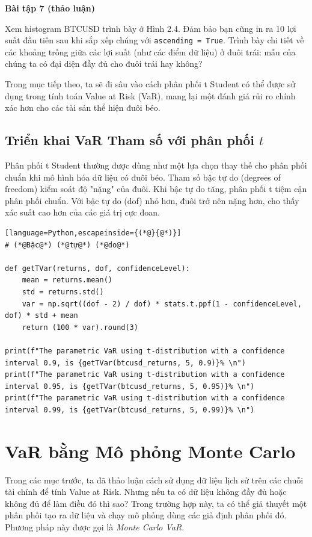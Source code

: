 \textbf{Bài tập 7 (thảo luận)}

Xem histogram BTCUSD trình bày ở Hình 2.4. Đảm bảo bạn cũng in ra 10 lợi suất đầu tiên sau khi sắp xếp chúng với \texttt{ascending = True}. Trình bày chi tiết về các khoảng trống giữa các lợi suất (như các điểm dữ liệu) ở đuôi trái: mẫu của chúng ta có đại diện đầy đủ cho đuôi trái hay không?

Trong mục tiếp theo, ta sẽ đi sâu vào cách phân phối t Student có thể được sử dụng trong tính toán Value at Risk (VaR), mang lại một đánh giá rủi ro chính xác hơn cho các tài sản thể hiện đuôi béo.

\subsection{Triển khai VaR Tham số với phân phối $t$}

Phân phối t Student thường được dùng như một lựa chọn thay thế cho phân phối chuẩn khi mô hình hóa dữ liệu có đuôi béo. Tham số bậc tự do (degrees of freedom) kiểm soát độ "nặng" của đuôi. Khi bậc tự do tăng, phân phối t tiệm cận phân phối chuẩn. Với bậc tự do (dof) nhỏ hơn, đuôi trở nên nặng hơn, cho thấy xác suất cao hơn của các giá trị cực đoan.

\begin{lstlisting}[language=Python,escapeinside={(*@}{@*)}]
# (*@Bậc@*) (*@tự@*) (*@do@*)

def getTVar(returns, dof, confidenceLevel):
    mean = returns.mean()
    std = returns.std()
    var = np.sqrt((dof - 2) / dof) * stats.t.ppf(1 - confidenceLevel, dof) * std + mean
    return (100 * var).round(3)

print(f"The parametric VaR using t-distribution with a confidence interval 0.9, is {getTVar(btcusd_returns, 5, 0.9)}% \n")
print(f"The parametric VaR using t-distribution with a confidence interval 0.95, is {getTVar(btcusd_returns, 5, 0.95)}% \n")
print(f"The parametric VaR using t-distribution with a confidence interval 0.99, is {getTVar(btcusd_returns, 5, 0.99)}% \n")
\end{lstlisting}


\section{VaR bằng Mô phỏng Monte Carlo}

Trong các mục trước, ta đã thảo luận cách sử dụng dữ liệu lịch sử trên các chuỗi tài chính để tính Value at Risk. Nhưng nếu ta có dữ liệu không đầy đủ hoặc không đủ để làm điều đó thì sao? Trong trường hợp này, ta có thể giả thuyết một phân phối tạo ra dữ liệu và chạy mô phỏng dùng các giả định phân phối đó. Phương pháp này được gọi là \emph{Monte Carlo VaR}.

